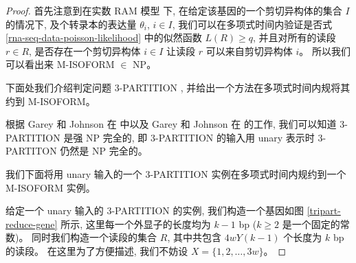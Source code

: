 \begin{proof}

首先注意到在实数 RAM 模型 \cite{Preparata:1985:CGI:4333} 下, 
在给定该基因的一个剪切异构体的集合 $I$ 的情况下, 及个转录本的表达量 $\theta_i$, $i\in I$, 
我们可以在多项式时间内验证是否式 \eqref{rna-seq-data-poisson-likelihood} 中的似然函数 $L(R) \geq q$, 
并且对所有的读段 $r\in R$, 
是否存在一个剪切异构体 $i\in I$ 让读段 $r$ 可以来自剪切异构体 $i$。 
所以我们可以看出来 M-ISOFORM $\in$ NP。 

下面处我们介绍判定问题 3-PARTITION \cite{doi:10.1137/0204035, Garey:1990:CIG:574848}, 
并给出一个方法在多项式时间内规将其约到 M-ISOFORM。 

\newtheorem*{tripart}{3-PARTITION}

\begin{center}
\end{center}

根据 Garey 和 Johnson 在  中以及 
Garey 和 Johnson 在  的工作, 
我们可以知道 3-PARTITION 是强 NP 完全的, 
即 3-PARTITION 的输入用 unary 表示时 3-PARTITON 仍然是 NP 完全的。 

我们下面将用 unary 输入的一个 3-PARTITION 实例在多项式时间内规约到一个 M-ISOFORM 实例。 

给定一个 unary 输入的 3-PARTITION 的实例, 
我们构造一个基因如图 \ref{tripart-reduce-gene} 所示, 
这里每一个外显子的长度均为 $k-1$ bp ($k\geq 2$ 是一个固定的常数)。 
同时我们构造一个读段的集合 $R$, 
其中共包含 $4wY(k-1)$ 个长度为 $k$ bp 的读段。 
在这里为了方便描述, 我们不妨设 $X=\{1,2,\ldots,3w\}$。 


\end{proof}
